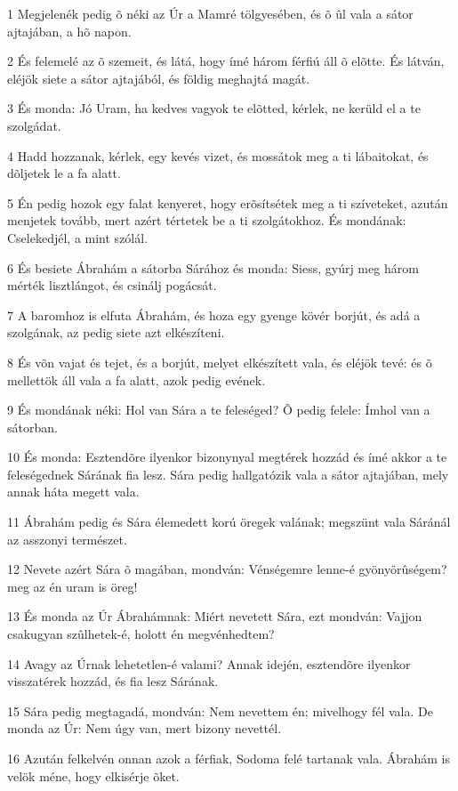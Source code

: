 \par 1 Megjelenék pedig õ néki az Úr a Mamré tölgyesében, és õ ûl vala a sátor ajtajában, a hõ napon.
\par 2 És felemelé az õ szemeit, és látá, hogy ímé három férfiú áll õ elõtte. És látván, eléjök siete a sátor ajtajából, és földig meghajtá magát.
\par 3 És monda: Jó Uram, ha kedves vagyok te elõtted, kérlek, ne kerüld el a te szolgádat.
\par 4 Hadd hozzanak, kérlek, egy kevés vizet, és mossátok meg a ti lábaitokat, és dõljetek le a fa alatt.
\par 5 Én pedig hozok egy falat kenyeret, hogy erõsítsétek meg a ti szíveteket, azután menjetek tovább, mert azért tértetek be a ti szolgátokhoz. És mondának: Cselekedjél, a mint szólál.
\par 6 És besiete Ábrahám a sátorba Sárához és monda: Siess, gyúrj meg három mérték lisztlángot, és csinálj pogácsát.
\par 7 A baromhoz is elfuta Ábrahám, és hoza egy gyenge kövér borjút, és adá a szolgának, az pedig siete azt elkészíteni.
\par 8 És võn vajat és tejet, és a borjút, melyet elkészített vala, és eléjök tevé: és õ mellettök áll vala a fa alatt, azok pedig evének.
\par 9 És mondának néki: Hol van Sára a te feleséged? Õ pedig felele: Ímhol van a sátorban.
\par 10 És monda: Esztendõre ilyenkor bizonynyal megtérek hozzád és ímé akkor a te feleségednek Sárának fia lesz. Sára pedig hallgatózik vala a sátor ajtajában, mely annak háta megett vala.
\par 11 Ábrahám pedig és Sára élemedett korú öregek valának; megszünt vala Sáránál az asszonyi természet.
\par 12 Nevete azért Sára õ magában, mondván: Vénségemre lenne-é gyönyörûségem? meg az én uram is öreg!
\par 13 És monda az Úr Ábrahámnak: Miért nevetett Sára, ezt mondván: Vajjon csakugyan szûlhetek-é, holott én megvénhedtem?
\par 14 Avagy az Úrnak lehetetlen-é valami? Annak idején, esztendõre ilyenkor visszatérek hozzád, és fia lesz Sárának.
\par 15 Sára pedig megtagadá, mondván: Nem nevettem én; mivelhogy fél vala. De monda az Úr: Nem úgy van, mert bizony nevettél.
\par 16 Azután felkelvén onnan azok a férfiak, Sodoma felé tartanak vala. Ábrahám is velök méne, hogy elkisérje õket.
